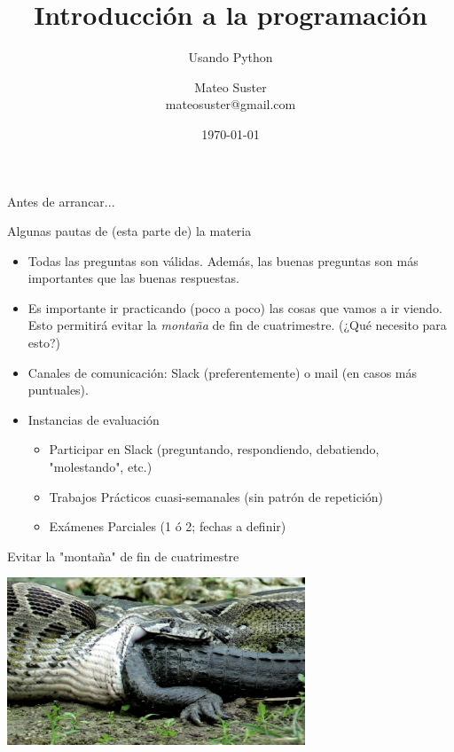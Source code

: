 \documentclass{beamer}
\title[Intro Prog] %
{Introducción a la programación}
\subtitle
{Usando Python}
\author[MS]
{Mateo Suster \\ mateosuster@gmail.com}%
\institute[UNGS] %
{
  Matemática para Economistas III \\ 
  Instituto de Industria\\
  Universidad Nacional de General Sarmiento
}
\date[] %
{ \today}
\begin{document}
\begin{frame}
  \titlepage
\end{frame}


\begin{frame}{Antes de arrancar...}
  \begin{block}{Algunas pautas de (esta parte de) la materia}
  \end{block}\pause
  \begin{itemize}
  	\item Todas las preguntas son válidas. \pause Además, las buenas preguntas son más importantes que las buenas respuestas. \pause
	\item Es importante ir practicando (poco a poco) las cosas que vamos a ir viendo. \pause Esto permitirá evitar la \emph{montaña} de fin de cuatrimestre. \pause (¿Qué necesito para esto?) \pause
	\item Canales de comunicación: \pause Slack (preferentemente) o mail (en casos más puntuales). \pause
	\item Instancias de evaluación \pause
		\begin{itemize}
			\item Participar en Slack (preguntando, respondiendo, debatiendo, "molestando", etc.) \pause
			\item Trabajos Prácticos cuasi-semanales (sin patrón de repetición)\pause
			\item Exámenes Parciales (1 ó 2; fechas a definir)
		\end{itemize}	
  \end{itemize}
\end{frame}

\begin{frame}{Evitar la "montaña" de fin de cuatrimestre} \pause
\begin{center}
\includegraphics[height=5cm, scale=0.5]{recursos/eat_alligator.jpg}
\end{center}
\end{frame}
\end{document}
